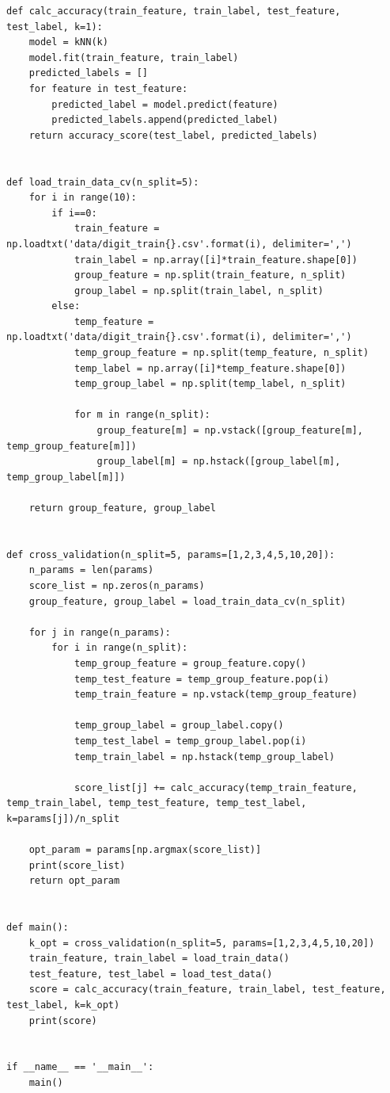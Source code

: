 \documentclass[11pt,a4paper,dvipdfmx]{article}
\theoremstyle{plain}
\newcommand{\1}{\mbox{1}\hspace{-0.25em}\mbox{l}}
\begin{document}
\begin{lstlisting}
def calc_accuracy(train_feature, train_label, test_feature, test_label, k=1):
    model = kNN(k)
    model.fit(train_feature, train_label)
    predicted_labels = []
    for feature in test_feature:
        predicted_label = model.predict(feature)
        predicted_labels.append(predicted_label)
    return accuracy_score(test_label, predicted_labels)


def load_train_data_cv(n_split=5):
    for i in range(10):
        if i==0:
            train_feature = np.loadtxt('data/digit_train{}.csv'.format(i), delimiter=',')
            train_label = np.array([i]*train_feature.shape[0])
            group_feature = np.split(train_feature, n_split)
            group_label = np.split(train_label, n_split)
        else:
            temp_feature = np.loadtxt('data/digit_train{}.csv'.format(i), delimiter=',')
            temp_group_feature = np.split(temp_feature, n_split)
            temp_label = np.array([i]*temp_feature.shape[0])
            temp_group_label = np.split(temp_label, n_split)
            
            for m in range(n_split):
                group_feature[m] = np.vstack([group_feature[m], temp_group_feature[m]])
                group_label[m] = np.hstack([group_label[m], temp_group_label[m]])
            
    return group_feature, group_label


def cross_validation(n_split=5, params=[1,2,3,4,5,10,20]):
    n_params = len(params)
    score_list = np.zeros(n_params)
    group_feature, group_label = load_train_data_cv(n_split)
    
    for j in range(n_params):
        for i in range(n_split):
            temp_group_feature = group_feature.copy()
            temp_test_feature = temp_group_feature.pop(i)
            temp_train_feature = np.vstack(temp_group_feature)
            
            temp_group_label = group_label.copy()
            temp_test_label = temp_group_label.pop(i)
            temp_train_label = np.hstack(temp_group_label)
            
            score_list[j] += calc_accuracy(temp_train_feature, temp_train_label, temp_test_feature, temp_test_label, k=params[j])/n_split

    opt_param = params[np.argmax(score_list)]
    print(score_list)
    return opt_param


def main():
    k_opt = cross_validation(n_split=5, params=[1,2,3,4,5,10,20])
    train_feature, train_label = load_train_data()
    test_feature, test_label = load_test_data()
    score = calc_accuracy(train_feature, train_label, test_feature, test_label, k=k_opt)
    print(score)


if __name__ == '__main__':
    main()

\end{lstlisting}
\end{document}
